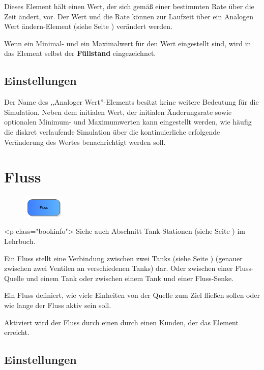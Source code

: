 Dieses Element hält einen Wert, der sich gemäß einer bestimmten Rate über die Zeit ändert, vor.
Der Wert und die Rate können zur Laufzeit über ein
Analogen Wert ändern-Element (siehe Seite \pageref{ref:ModelElementAnalogAssign}) verändert werden.

Wenn ein Minimal- und ein Maximalwert für den Wert eingestellt sind, wird in das Element
selbst der \textbf{Füllstand} eingezeichnet.

\subsection*{Einstellungen}

Der Name des ,,Analoger Wert''-Elements besitzt keine weitere Bedeutung für die Simulation.
Neben dem initialen Wert, der initialen Änderungsrate sowie optionalen Minimum- und Maximumwerten
kann eingestellt werden, wie häufig die diskret verlaufende Simulation über die kontinuierliche
erfolgende Veränderung des Wertes benachrichtigt werden soll.


\section{Fluss}
\label{ref:ModelElementTankFlowByClient}

\begin{figure}
\vspace{-22pt}
\includegraphics[width=2cm]{imageModelElementTankFlowByClient.png}
\vspace{-22pt}
\end{figure}

<p class="bookinfo">
Siehe auch Abschnitt Tank-Stationen (siehe Seite \pageref{ref:book:8.8.2}) im Lehrbuch.

Ein Fluss stellt eine Verbindung zwischen zwei Tanks (siehe Seite \pageref{ref:ModelElementTank}) 
(genauer zwischen zwei Ventilen an verschiedenen Tanks) dar.
Oder zwischen einer Fluss-Quelle und einem Tank oder zwischen einem Tank und einer Fluss-Senke.

Ein Fluss definiert, wie viele Einheiten von der Quelle zum Ziel fließen sollen oder wie
lange der Fluss aktiv sein soll.

Aktiviert wird der Fluss durch einen durch einen Kunden, der das Element erreicht.

\subsection*{Einstellungen}

